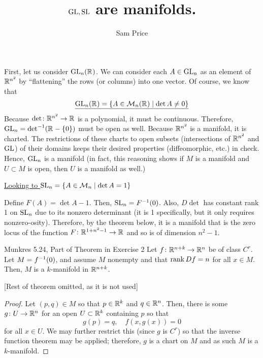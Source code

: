 \documentclass{article}
\author{Sam Price}
\title{$\GL, \SL$ are manifolds.}
\begin{document}
\maketitle

First, let us consider $\GL_{n}(\RR)$.
We can consider each $A \in \GL_{n}$ as an element of $\RR[n^{2}]$ by ``flattening'' the rows (or columns) into one vector.
Of course, we know that
\[ \underline{\GL_{n}(\RR) = \set{ A \in \mathcal{M}_{n}(\RR) \mid \det A \ne 0 }} \]
Because $\det \from \RR[n^{2}] \to \RR$ is a polynomial, it must be continuous.
Therefore, $\GL_{n} = \det\inv(\RR - \set{0})$ must be open as well.
Because $\RR[n^{2}]$ is a manifold, it is charted.
The restrictions of these charts to open subsets (intersections of $\RR[n^{2}]$ and $\GL$) of their domains keeps their desired properties (diffeomorphic, etc.) in check.
Hence, $\GL_{n}$ is a manifold (in fact, this reasoning shows if $M$ is a manifold and $U \subset M$ is open, then $U$ is a manifold as well.)

\begin{center}
  \underline{Looking to $\SL_{n} = \set{ A \in \mathcal{M}_{n} \mid \det A = 1 }$}
\end{center}
Define $F(A) = \det A - 1$. Then, $\SL_{n} = F\inv(0)$.
Also, $D\det$ has constant rank 1 on $\SL_{n}$ due to its nonzero determinant (it is 1 specifically, but it only requires nonzero-osity).
Therefore, by the theorem below, it is a manifold that is the zero locus of the function $F \from \RR[1 + n^{2} - 1] \to \RR$ and so
is of dimension $n^{2} - 1$.

\begin{theorem}{Munkres 5.24, Part of Theorem in Exercise 2}{}
  Let $f \from \RR[n + k] \to \RR[n]$ be of class $C^{r}$. Let $M = f\inv(0)$, and assume $M$ nonempty and that $\rank Df = n$ for all $x \in M$.
  Then, $M$ is a $k$-manifold in $\RR[n + k]$.

  [Rest of theorem omitted, as it is not used]
\end{theorem}
\begin{proof}
  Let $(p, q) \in M$ so that $p \in \RR[k]$ and $q \in \RR[n]$.
  Then, there is some $g \from U \to \RR[n]$ for an open $U \subset \RR[k]$ containing $p$ so that
  \[ g(p) = q,\quad f(x, g(x)) = 0 \]
  for all $x \in U$. We may further restrict this (since $g$ is $C^{r}$) so that the inverse function theorem may be applied;
  therefore, $g$ is a chart on $M$ and as such $M$ is a $k$-manifold.
\end{proof}
\end{document}
